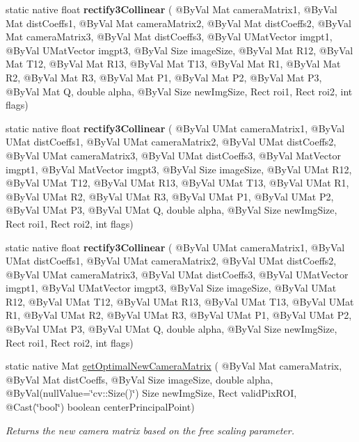 \begin{DoxyCompactItemize}
\item 
static native float {\bfseries rectify3\+Collinear} ( @By\+Val Mat camera\+Matrix1, @By\+Val Mat dist\+Coeffs1, @By\+Val Mat camera\+Matrix2, @By\+Val Mat dist\+Coeffs2, @By\+Val Mat camera\+Matrix3, @By\+Val Mat dist\+Coeffs3, @By\+Val U\+Mat\+Vector imgpt1, @By\+Val U\+Mat\+Vector imgpt3, @By\+Val Size image\+Size, @By\+Val Mat R12, @By\+Val Mat T12, @By\+Val Mat R13, @By\+Val Mat T13, @By\+Val Mat R1, @By\+Val Mat R2, @By\+Val Mat R3, @By\+Val Mat P1, @By\+Val Mat P2, @By\+Val Mat P3, @By\+Val Mat Q, double alpha, @By\+Val Size new\+Img\+Size, Rect roi1, Rect roi2, int flags)
\item 
static native float {\bfseries rectify3\+Collinear} ( @By\+Val U\+Mat camera\+Matrix1, @By\+Val U\+Mat dist\+Coeffs1, @By\+Val U\+Mat camera\+Matrix2, @By\+Val U\+Mat dist\+Coeffs2, @By\+Val U\+Mat camera\+Matrix3, @By\+Val U\+Mat dist\+Coeffs3, @By\+Val Mat\+Vector imgpt1, @By\+Val Mat\+Vector imgpt3, @By\+Val Size image\+Size, @By\+Val U\+Mat R12, @By\+Val U\+Mat T12, @By\+Val U\+Mat R13, @By\+Val U\+Mat T13, @By\+Val U\+Mat R1, @By\+Val U\+Mat R2, @By\+Val U\+Mat R3, @By\+Val U\+Mat P1, @By\+Val U\+Mat P2, @By\+Val U\+Mat P3, @By\+Val U\+Mat Q, double alpha, @By\+Val Size new\+Img\+Size, Rect roi1, Rect roi2, int flags)
\item 
static native float {\bfseries rectify3\+Collinear} ( @By\+Val U\+Mat camera\+Matrix1, @By\+Val U\+Mat dist\+Coeffs1, @By\+Val U\+Mat camera\+Matrix2, @By\+Val U\+Mat dist\+Coeffs2, @By\+Val U\+Mat camera\+Matrix3, @By\+Val U\+Mat dist\+Coeffs3, @By\+Val U\+Mat\+Vector imgpt1, @By\+Val U\+Mat\+Vector imgpt3, @By\+Val Size image\+Size, @By\+Val U\+Mat R12, @By\+Val U\+Mat T12, @By\+Val U\+Mat R13, @By\+Val U\+Mat T13, @By\+Val U\+Mat R1, @By\+Val U\+Mat R2, @By\+Val U\+Mat R3, @By\+Val U\+Mat P1, @By\+Val U\+Mat P2, @By\+Val U\+Mat P3, @By\+Val U\+Mat Q, double alpha, @By\+Val Size new\+Img\+Size, Rect roi1, Rect roi2, int flags)
\item 
static native Mat \hyperlink{group__calib3d_ga70615047cb056a5e3787ce151ddef307}{get\+Optimal\+New\+Camera\+Matrix} ( @By\+Val Mat camera\+Matrix, @By\+Val Mat dist\+Coeffs, @By\+Val Size image\+Size, double alpha, @By\+Val(null\+Value=\char`\"{}cv\+::\+Size()\char`\"{}) Size new\+Img\+Size, Rect valid\+Pix\+R\+OI, @Cast(\char`\"{}bool\char`\"{}) boolean center\+Principal\+Point)
\begin{DoxyCompactList}\small\item\em Returns the new camera matrix based on the free scaling parameter. \end{DoxyCompactList}\item 

\end{DoxyCompactItemize}
